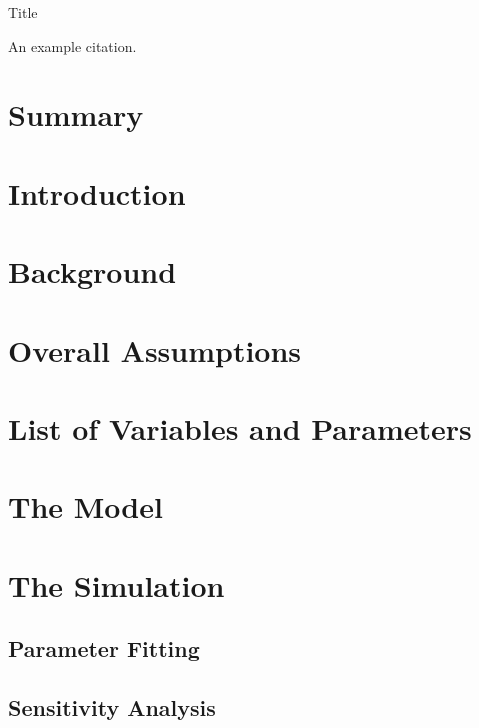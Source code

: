 \documentclass[12pt]{article}
\begin{document}
\begin{center}
{\Large Title}
\end{center}


An example citation. \cite{latexcompanion}


\section{Summary}

\section{Introduction}

\section{Background}

\section{Overall Assumptions}

\section{List of Variables and Parameters}

\section{The Model}

\section{The Simulation}
\subsection{Parameter Fitting}
\subsection{Sensitivity Analysis}
\end{document}
